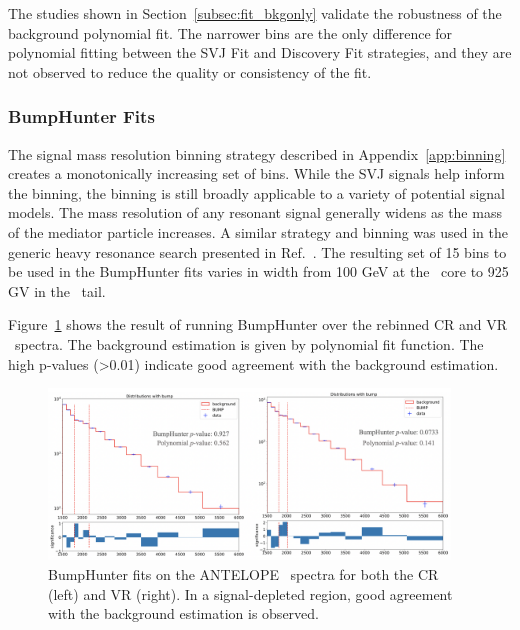 The studies shown in Section~\ref{subsec:fit_bkgonly} validate the robustness of the background polynomial fit. 
The narrower bins are the only difference for polynomial fitting between the SVJ Fit and Discovery Fit strategies, and they are not observed to reduce the quality or consistency of the fit. 

\subsubsection{BumpHunter Fits}
\label{subsec:bhfits}

The signal mass resolution binning strategy described in Appendix~\ref{app:binning} creates a monotonically increasing set of bins. 
While the SVJ signals help inform the binning, the binning is still broadly applicable to a variety of potential signal models.
The mass resolution of any resonant signal generally widens as the mass of the mediator particle increases.
A similar strategy and binning was used in the generic heavy resonance search presented in Ref.~\cite{yxh}.
The resulting set of 15 bins to be used in the BumpHunter fits varies in width from 100 GeV at the \mt~core to 925 GV in the \mt~tail. 

Figure~\ref{fig:antelope_bh_crvr} shows the result of running BumpHunter over the rebinned CR and VR \mt~spectra.
The background estimation is given by polynomial fit function. 
The high p-values (>0.01) indicate good agreement with the background estimation.
\begin{figure}[!htbp]
\centering
   \includegraphics[width=0.95\textwidth]{figures/stats/antelope_bh_crvr}
    \caption{BumpHunter fits on the ANTELOPE \mt~spectra for both the CR (left) and VR (right). In a signal-depleted region, good agreement with the background estimation is observed.
    \label{fig:antelope_bh_crvr}}
\end{figure}

